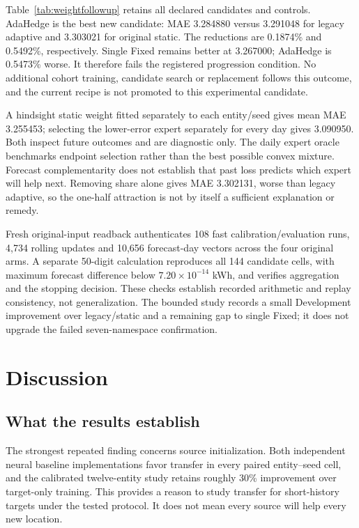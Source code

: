 \documentclass[pdflatex,iicol,sn-mathphys-num]{sn-jnl}
\begin{document}
\begin{table}[t]
\centering\small
\caption{Development MAE (kWh).}\label{tab:weightfollowup}

\end{table}
Table~\ref{tab:weightfollowup} retains all declared candidates and controls. AdaHedge is the best new candidate: MAE 3.284880 versus 3.291048 for legacy adaptive and 3.303021 for original static. The reductions are 0.1874\% and 0.5492\%, respectively. Single Fixed remains better at 3.267000; AdaHedge is 0.5473\% worse. It therefore fails the registered progression condition. No additional cohort training, candidate search or replacement follows this outcome, and the current recipe is not promoted to this experimental candidate.

A hindsight static weight fitted separately to each entity/seed gives mean MAE 3.255453; selecting the lower-error expert separately for every day gives 3.090950. Both inspect future outcomes and are diagnostic only. The daily expert oracle benchmarks endpoint selection rather than the best possible convex mixture. Forecast complementarity does not establish that past loss predicts which expert will help next. Removing share alone gives MAE 3.302131, worse than legacy adaptive, so the one-half attraction is not by itself a sufficient explanation or remedy.

Fresh original-input readback authenticates 108 fast calibration/evaluation runs, 4,734 rolling updates and 10,656 forecast-day vectors across the four original arms. A separate 50-digit calculation reproduces all 144 candidate cells, with maximum forecast difference below $7.20\times10^{-14}$ kWh, and verifies aggregation and the stopping decision. These checks establish recorded arithmetic and replay consistency, not generalization. The bounded study records a small Development improvement over legacy/static and a remaining gap to single Fixed; it does not upgrade the failed seven-namespace confirmation.

\section{Discussion}
\subsection{What the results establish}
The strongest repeated finding concerns source initialization. Both independent neural baseline implementations favor transfer in every paired entity--seed cell, and the calibrated twelve-entity study retains roughly 30\% improvement over target-only training. This provides a reason to study transfer for short-history targets under the tested protocol. It does not mean every source will help every new location.
\end{document}
